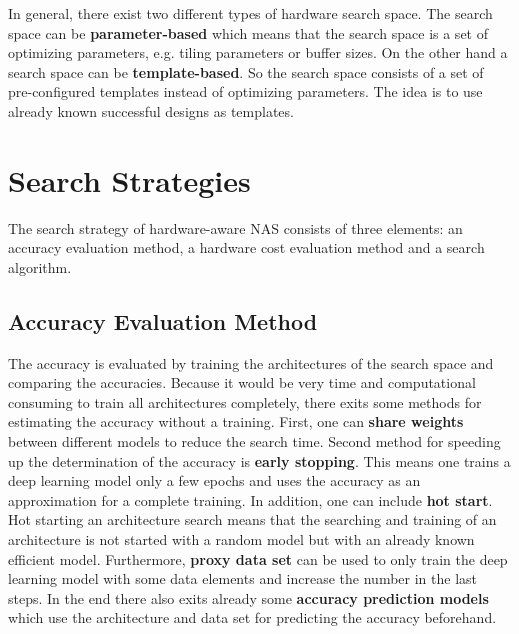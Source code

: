 \documentclass[conference]{IEEEtran}
\begin{document}
In general, there exist two different types of hardware search space. The search space can be \textbf{parameter-based} which means that the search space is a set of optimizing parameters, e.g. tiling parameters or buffer sizes. On the other hand a search space can be \textbf{template-based}. So the search space consists of a set of pre-configured templates instead of optimizing parameters. The idea is to use already known successful designs as templates.

\section{Search Strategies}
\label{section:SearchStrategy}

The search strategy of hardware-aware NAS consists of three elements: an accuracy evaluation method, a hardware cost evaluation method and a search algorithm. 

\subsection{Accuracy Evaluation Method}
The accuracy is evaluated by training the architectures of the search space and comparing the accuracies. Because it would be very time and computational consuming to train all architectures completely, there exits some methods for estimating the accuracy without a training. First, one can  \textbf{share weights} between different models to reduce the search time. Second method for speeding up the determination of the accuracy is \textbf{early stopping}. This means one trains a deep learning model only a few epochs and uses the accuracy as an approximation for a complete training. In addition, one can include \textbf{hot start}. Hot starting an architecture search means that the searching and training of an architecture is not started with a random model but with an already known efficient model. Furthermore, \textbf{proxy data set} can be used to only train the deep learning model with some data elements and increase the number in the last steps. In the end there also exits already some \textbf{accuracy prediction models} which use the architecture and data set for predicting the accuracy beforehand. 
\end{document}
